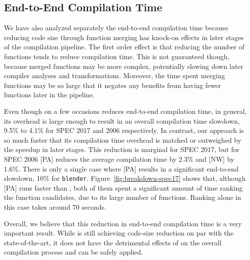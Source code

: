 \subsection{End-to-End Compilation Time} \label{sec:eval:compilation-time}

We have also analyzed separately the end-to-end compilation time because reducing code size through function merging has knock-on effects in later stages of the compilation pipeline.
The first order effect is that reducing the number of functions tends to reduce compilation time.
This is not guaranteed though, because merged functions may be more complex, potentially slowing down later compiler analyses and transformations.
Moreover, the time spent merging functions may be so large that it negates any benefits from having fewer functions later in the pipeline.

Even though on a few occasions {\SOAName} reduces end-to-end compilation time, in general, its overhead is large enough to result in an overall compilation time slowdown, 9.5\% to 4.1\% for SPEC 2017 and 2006 respectively.
In contrast, our approach is so much faster that its compilation time overhead is matched or outweighed by the speedup in later stages. 
This reduction is marginal for SPEC 2017, but for SPEC 2006 {[PA]} reduces the average compilation time by 2.3\% and {[NW]} by 1.6\%.
There is only a single case where {[PA]} results in a significant end-to-end slowdown, 10\% for \texttt{blender}.
Figure~\ref{fig:breakdown-spec17} shows that, although [PA] runs faster than {\SOAName}, both of them spent a significant amount of time ranking the function candidates, due to its large number of functions.
Ranking alone in this case takes around 70 seconds. %

Overall, we believe that this reduction in end-to-end compilation time is a very important result. While {\ProjName} is still achieving code-size reduction on par with the state-of-the-art, it does not have the detrimental effects of {\SOAName} on the overall compilation process and can be safely applied.

